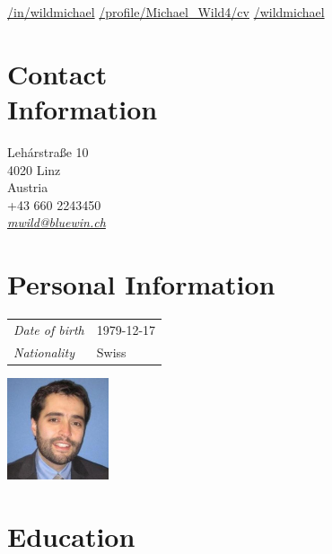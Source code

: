 \documentclass[line,11pt,a4paper]{../resume}
\newcommand{\mail}[1]{\textsl{\href{mailto:#1}{#1}}}
\begin{document}
\begin{resume}
\vspace{-4mm}
\-\hspace{-12.3mm}\begin{minipage}{15cm}
\href{https://linkedin.com/in/wildmichael}{\faLinkedinSquare/in/wildmichael}\quad
\href{https://xing.com/profile/Michael_Wild4/cv}{\faXingSquare/profile/Michael\_Wild4/cv}\quad
\href{https://github.com/wildmichael}{\faGithubSquare/wildmichael}
\end{minipage}

\begin{multicols}{3}

\section{\mysidestyle Contact\\Information}\vspace{0.9mm}

Leh\'{a}rstra{\ss}e 10 \\
4020 Linz \\
Austria \\
+43 660 2243450 \\
\mail{mwild@bluewin.ch}\\

\columnbreak

\section{\mysidestyle Personal Information}\vspace{2mm}

\begin{tabular}{@{}ll}
\textsl{Date of birth} & 1979-12-17 \\
\textsl{Nationality}   & Swiss
\end{tabular}

\columnbreak
\vspace*{-9mm}\hfill\includegraphics[width=30mm]{../mwild}

\end{multicols}

\section{\mysidestyle Education}\vspace{2mm}


\end{resume}
\end{document}
